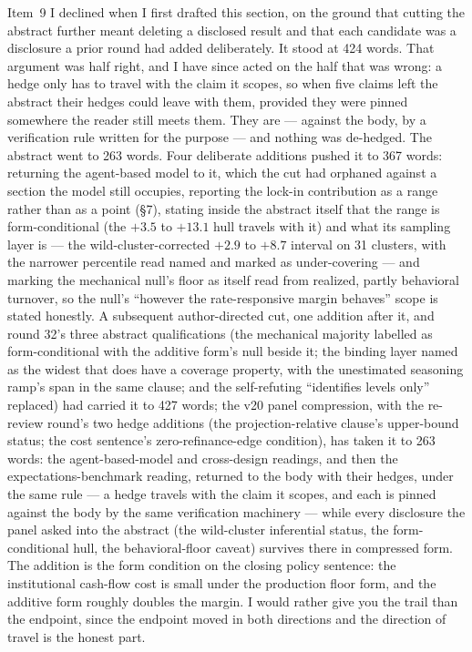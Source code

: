 \documentclass[11pt]{article}
\begin{document}
Item~9 I declined when I first drafted this section, on the ground that cutting the
abstract further meant deleting a disclosed result and that each candidate was a
disclosure a prior round had added deliberately. It stood at 424 words. That
argument was half right, and I have since acted on the half that was wrong: a hedge
only has to travel with the claim it scopes, so when five claims left the abstract
their hedges could leave with them, provided they were pinned somewhere the reader
still meets them. They are --- against the body, by a verification rule written for
the purpose --- and nothing was de-hedged. The abstract went to 263 words. Four
deliberate additions pushed it to 367 words: returning the agent-based model to
it, which the cut had orphaned against a section the model still occupies,
reporting the lock-in contribution as a range rather than as a point (\S7),
stating inside the abstract itself that the range is form-conditional (the
$+3.5$ to $+13.1$ hull travels with it) and what its sampling layer is --- the
wild-cluster-corrected $+2.9$ to $+8.7$ interval on 31 clusters, with the
narrower percentile read named and marked as under-covering --- and marking the
mechanical null's floor as itself read from realized, partly behavioral
turnover, so the null's ``however the rate-responsive margin behaves'' scope is stated honestly. A
subsequent author-directed cut, one addition after it, and round 32's three abstract qualifications
(the mechanical majority labelled as form-conditional with the additive form's null beside
it; the binding layer named as the widest that does have a coverage property, with the
unestimated seasoning ramp's span in the same clause; and the self-refuting ``identifies
levels only'' replaced) had carried it to 427 words; the v20 panel compression, with the re-review round's two hedge additions (the projection-relative clause's upper-bound status; the cost sentence's zero-refinance-edge condition), has taken it to 263 words: the agent-based-model
and cross-design readings, and then the expectations-benchmark reading, returned to
the body with their hedges, under the same rule --- a hedge travels with the claim
it scopes, and each is pinned against the body by the same verification
machinery --- while every disclosure the panel asked into the abstract (the
wild-cluster inferential status, the form-conditional hull, the behavioral-floor
caveat) survives there in compressed form. The addition is the form condition on the closing policy sentence: the institutional cash-flow cost is small under the production floor form, and the additive form roughly doubles the margin. I would
rather give you the trail than the endpoint, since the endpoint moved in both directions
and the direction of travel is the honest part.
\end{document}
